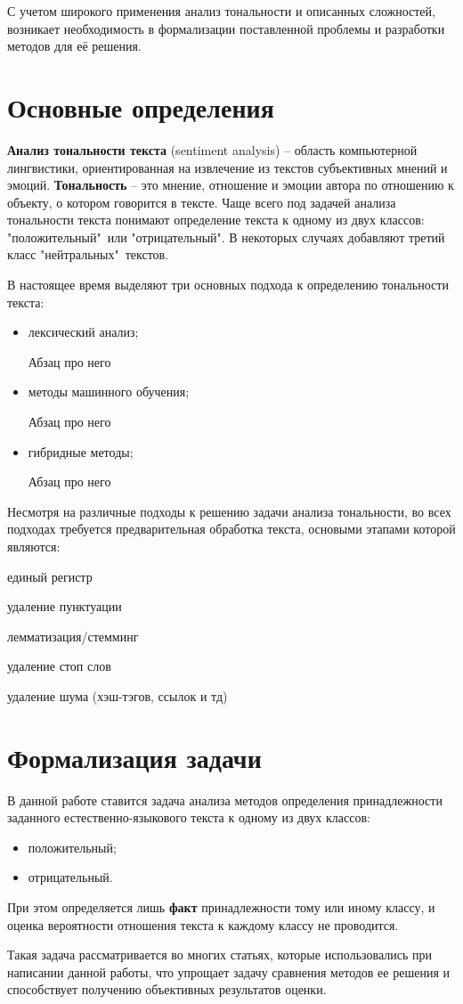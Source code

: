 С учетом широкого применения анализ тональности и описанных сложностей,
возникает необходимость в формализации поставленной проблемы и разработки
методов для её решения.

\section{Основные определения}

\textbf{Анализ тональности текста} (sentiment analysis) -- область компьютерной
лингвистики, ориентированная на извлечение из текстов субъективных мнений и
эмоций. \textbf{Тональность} -- это мнение, отношение и эмоции автора по
отношению к объекту, о котором говорится в тексте.  Чаще всего под задачей
анализа тональности текста понимают определение текста к одному из двух классов:
"положительный"\ или "отрицательный". В некоторых случаях добавляют третий класс
"нейтральных"\ текстов.\cite{article9}

В настоящее время выделяют три основных подхода к определению тональности
текста:
\begin{itemize}
    \item лексический анализ;

        Абзац про него

    \item методы машинного обучения;

        Абзац про него

    \item  гибридные методы;

        Абзац про него
\end{itemize}

Несмотря на различные подходы к решению задачи анализа тональности, во всех
подходах требуется предварительная обработка текста, основыми этапами которой
являются:

единый регистр

удаление пунктуации

лемматизация/стемминг

удаление стоп слов

удаление шума (хэш-тэгов, ссылок и тд)


\section{Формализация задачи}

В данной работе ставится задача анализа методов определения принадлежности
заданного естественно-языкового текста к одному из двух классов:
\begin{itemize}
    \item положительный;
    \item отрицательный.
\end{itemize}

При этом определяется лишь \textbf{факт} принадлежности тому или иному
классу, и оценка вероятности отношения текста к каждому классу не проводится.

Такая задача рассматривается во многих статьях, которые использовались при
написании данной работы, что упрощает задачу сравнения методов ее решения и
способствует получению объективных результатов оценки.

